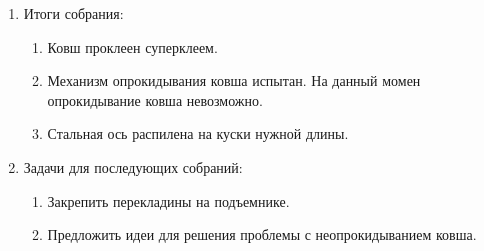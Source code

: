 \begin{enumerate}
\begin{enumerate}
    \end{enumerate}
    
	\item Итоги собрания: 
	\begin{enumerate}
	  \item Ковш проклеен суперклеем.
	  
	  \item Механизм опрокидывания ковша испытан. На данный момен опрокидывание ковша невозможно.
	  
	  \item Стальная ось распилена на куски нужной длины.
	  
    \end{enumerate}
    
	\item Задачи для последующих собраний:
	\begin{enumerate}
	  \item Закрепить перекладины на подъемнике.
	  
	  \item Предложить идеи для решения проблемы с неопрокидыванием ковша.
	  
    \end{enumerate}     
\end{enumerate}
\fillpage
